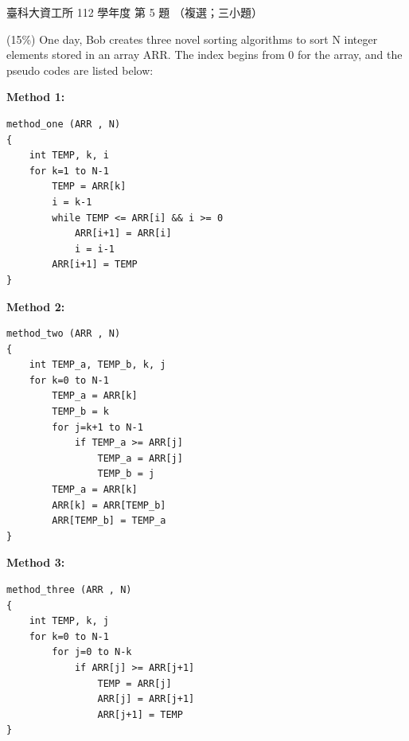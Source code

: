 \begin{pastexam}[label={px:ntust-112-ice-05}]{臺科大資工所 112 學年度 第 5 題}
（複選；三小題）

(15\%) One day, Bob creates three novel sorting algorithms to sort N integer elements stored in an
array ARR. The index begins from 0 for the array, and the pseudo codes are listed below:

\noindent\textbf{Method 1:}
\begin{verbatim}
method_one (ARR , N)
{
    int TEMP, k, i
    for k=1 to N-1
        TEMP = ARR[k]
        i = k-1
        while TEMP <= ARR[i] && i >= 0
            ARR[i+1] = ARR[i]
            i = i-1
        ARR[i+1] = TEMP
}
\end{verbatim}

\noindent\textbf{Method 2:}
\begin{verbatim}
method_two (ARR , N)
{
    int TEMP_a, TEMP_b, k, j
    for k=0 to N-1
        TEMP_a = ARR[k]
        TEMP_b = k
        for j=k+1 to N-1
            if TEMP_a >= ARR[j]
                TEMP_a = ARR[j]
                TEMP_b = j
        TEMP_a = ARR[k]
        ARR[k] = ARR[TEMP_b]
        ARR[TEMP_b] = TEMP_a
}
\end{verbatim}

\noindent\textbf{Method 3:}
\begin{verbatim}
method_three (ARR , N)
{
    int TEMP, k, j
    for k=0 to N-1
        for j=0 to N-k
            if ARR[j] >= ARR[j+1]
                TEMP = ARR[j]
                ARR[j] = ARR[j+1]
                ARR[j+1] = TEMP
}
\end{verbatim}


\end{pastexam}
